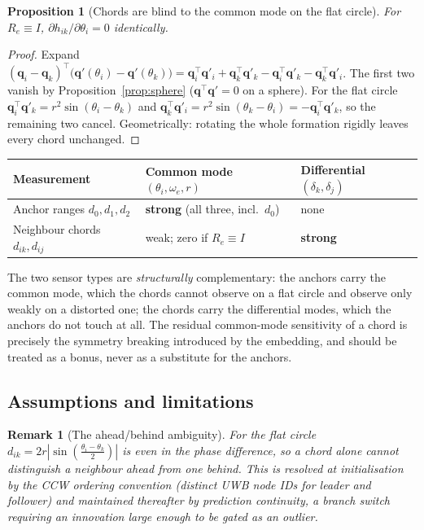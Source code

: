 \documentclass[11pt,a4paper]{article}
\newtheorem{proposition}{Proposition}
\newtheorem{remark}{Remark}
\newcommand{\q}{\bm{q}}
\newcommand{\Rot}{R}
\begin{document}
\begin{proposition}[Chords are blind to the common mode on the flat circle]
\label{prop:commonblind}
For $\Rot_e\equiv I$, $\partial h_{ik}/\partial\theta_i = 0$ identically.
\end{proposition}
\begin{proof}
Expand
$(\q_i-\q_k)^\top\big(\q'(\theta_i)-\q'(\theta_k)\big)
= \q_i^\top\q'_i + \q_k^\top\q'_k - \q_i^\top\q'_k - \q_k^\top\q'_i$.
The first two vanish by Proposition~\ref{prop:sphere}
($\q^\top\q' = 0$ on a sphere). For the flat circle
$\q_i^\top\q'_k = r^2\sin(\theta_i-\theta_k)$ and
$\q_k^\top\q'_i = r^2\sin(\theta_k-\theta_i) = -\q_i^\top\q'_k$, so the
remaining two cancel. Geometrically: rotating the whole formation rigidly
leaves every chord unchanged.
\end{proof}

\begin{center}
\begin{tabular}{lll}
\toprule
Measurement & Common mode $(\theta_i,\omega_e,r)$ & Differential $(\delta_k,\delta_j)$ \\
\midrule
Anchor ranges $d_0,d_1,d_2$ & \textbf{strong} (all three, incl.\ $d_0$) & none \\
Neighbour chords $d_{ik},d_{ij}$ & weak; zero if $\Rot_e\equiv I$ & \textbf{strong} \\
\bottomrule
\end{tabular}
\end{center}

The two sensor types are \emph{structurally} complementary: the anchors carry
the common mode, which the chords cannot observe on a flat circle and observe
only weakly on a distorted one; the chords carry the differential modes, which
the anchors do not touch at all. The residual common-mode sensitivity of a chord
is precisely the symmetry breaking introduced by the embedding, and should be
treated as a bonus, never as a substitute for the anchors.

\subsection{Assumptions and limitations}

\begin{remark}[The ahead/behind ambiguity]
For the flat circle $d_{ik} = 2r|\sin(\tfrac{\theta_i-\theta_k}{2})|$ is even in
the phase difference, so a chord alone cannot distinguish a neighbour ahead from
one behind. This is resolved at initialisation by the CCW ordering convention
(distinct UWB node IDs for leader and follower) and maintained thereafter by
prediction continuity, a branch switch requiring an innovation large enough to
be gated as an outlier.
\end{remark}
\end{document}
